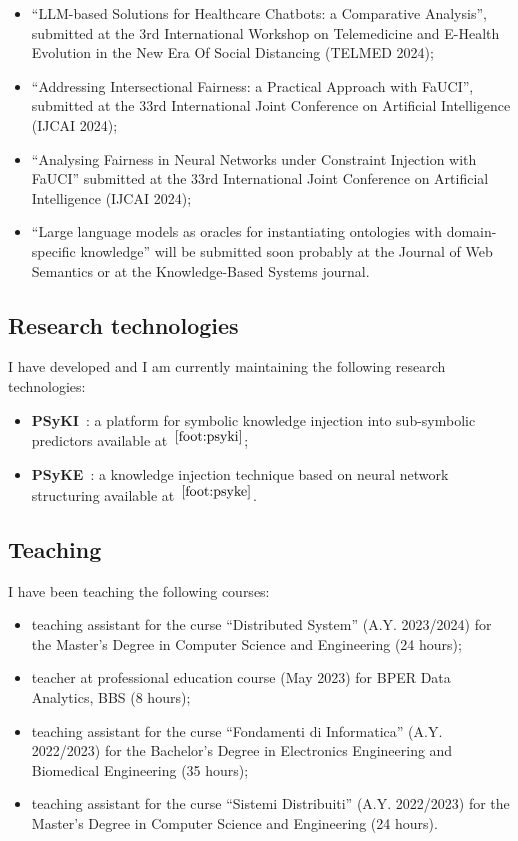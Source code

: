 \documentclass[]{scrartcl}
\begin{document}
    \begin{itemize}
        \item ``LLM-based Solutions for Healthcare Chatbots: a Comparative Analysis'', submitted at the 3rd International Workshop on Telemedicine and E-Health Evolution in the New Era Of Social Distancing (TELMED 2024);
        \item ``Addressing Intersectional Fairness: a Practical Approach with FaUCI'', submitted at the 33rd International Joint Conference on Artificial Intelligence (IJCAI 2024);
        \item ``Analysing Fairness in Neural Networks under Constraint Injection with FaUCI'' submitted at the 33rd International Joint Conference on Artificial Intelligence (IJCAI 2024);
        \item ``Large language models as oracles for instantiating ontologies with domain-specific knowledge'' will be submitted soon probably at the Journal of Web Semantics or at the Knowledge-Based Systems journal.
    \end{itemize}

    \subsection{Research technologies}
    \label{sec:done:technologies}
    I have developed and I am currently maintaining the following research technologies:
    \begin{itemize}
        \item \textbf{PSyKI}~\cite{psyki-extraamas2022}: a platform for symbolic knowledge injection into sub-symbolic predictors available at~$^{\ref{foot:psyki}}$;
        \item \textbf{PSyKE}~\cite{psyke-woa2021}: a knowledge injection technique based on neural network structuring available at~$^{\ref{foot:psyke}}$.
    \end{itemize}

    \subsection{Teaching}
    \label{sec:done:teaching}
    I have been teaching the following courses:
    \begin{itemize}
        \item teaching assistant for the curse ``Distributed System'' (A.Y. 2023/2024) for the Master's Degree in Computer Science and Engineering (24 hours);
        \item teacher at professional education course (May 2023) for BPER Data Analytics, BBS (8 hours);
        \item teaching assistant for the curse ``Fondamenti di Informatica'' (A.Y. 2022/2023) for the Bachelor's Degree in Electronics Engineering and Biomedical Engineering (35 hours);
        \item teaching assistant for the curse ``Sistemi Distribuiti'' (A.Y. 2022/2023) for the Master's Degree in Computer Science and Engineering (24 hours).
    \end{itemize}
\end{document}

